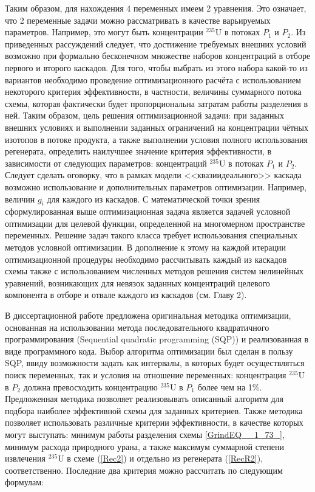 Таким образом, для нахождения 4 переменных имеем 2 уравнения. Это означает, что 2 переменные задачи можно рассматривать в качестве варьируемых параметров. Например, это могут быть концентрации  $^{235}$U в потоках $P_{1}$ и $P_{2}$. Из приведенных рассуждений следует, что достижение требуемых внешних условий возможно при формально бесконечном множестве наборов концентраций в отборе первого и второго каскадов. Для того, чтобы выбрать из этого набора какой-то из вариантов необходимо проведение оптимизационного расчёта с использованием некоторого критерия эффективности, в частности, величины суммарного потока схемы, которая фактически будет пропорциональна затратам работы разделения в ней. 
Таким образом, цель решения оптимизационной задачи: при заданных внешних условиях и выполнении заданных ограничений на концентрации чётных изотопов в потоке продукта, а также выполнении условия полного использования регенерата, определить наилучшее значение критерия эффективности, в зависимости от следующих параметров: концентраций $^{235}$U в потоках $P_{1}$ и $P_{2}$.
Следует сделать оговорку, что в рамках модели <<квазиидеального>> каскада возможно использование и дополнительных параметров оптимизации. Например, величин $g_{i}$ для каждого из каскадов. 
С математической точки зрения сформулированная выше оптимизационная задача является задачей условной оптимизации для целевой функции, определенной на многомерном пространстве переменных. Решение задач такого класса требует использования специальных методов условной оптимизации. В дополнение к этому на каждой итерации оптимизационной процедуры необходимо рассчитывать каждый из каскадов схемы также с использованием численных методов решения систем нелинейных уравнений, возникающих для невязок заданных концентраций целевого компонента в отборе и отвале каждого из каскадов (см. Главу 2). 
 
В диссертационной работе предложена оригинальная методика оптимизации, основанная на использовании метода последовательного квадратичного программирования (Sequential quadratic programming (SQP)) и реализованная в виде программного кода. Выбор алгоритма оптимизации был сделан в пользу SQP, ввиду возможности задать как интервалы, в которых будет осуществляться поиск переменных, так и условия на отношение переменных: концентрация $^{235}$U в $P_2$ должна превосходить концентрацию $^{235}$U в $P_1$ более чем на 1\%. Предложенная методика позволяет реализовывать описанный алгоритм для подбора наиболее эффективной схемы для заданных критериев. Также методика позволяет использовать различные критерии эффективности, в качестве которых могут выступать: минимум работы разделения схемы \ref{GrindEQ__1_73_}, минимум расхода природного урана, а также максимум суммарной степени извлечения $^{235}$U в схеме (\ref{Rec2}) и отдельно из регенерата (\ref{RecR2}), соответственно. Последние два критерия можно рассчитать по следующим формулам:

